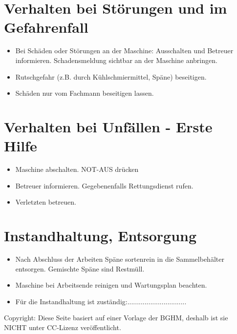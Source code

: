 \documentclass[fontsize=9pt]{scrartcl}
\newenvironment{smallitemize}{\begin{itemize}\itemsep -3pt}{\end{itemize}}
\begin{document}
\section{Verhalten bei Störungen und im Gefahrenfall}
\begin{smallitemize}
	\item Bei Schäden oder Störungen an der Maschine: Ausschalten und Betreuer informieren. Schadensmeldung sichtbar an der Maschine anbringen.
	\item Rutschgefahr (z.B. durch Kühlschmiermittel, Späne) beseitigen.
	\item Schäden nur vom Fachmann beseitigen lassen.
\end{smallitemize}

\section{Verhalten bei Unfällen - Erste Hilfe}
\begin{smallitemize}
	\item Maschine abschalten. NOT-AUS drücken
	\item Betreuer informieren. Gegebenenfalls Rettungsdienst rufen.
	\item Verletzten betreuen.
\end{smallitemize}

\section{Instandhaltung, Entsorgung}
\begin{smallitemize}
	\item Nach Abschluss der Arbeiten Späne sortenrein in die Sammelbehälter entsorgen. Gemischte Späne sind Restmüll.
	\item Maschine bei Arbeitsende reinigen und Wartungsplan beachten.
		\vspace{5mm}
	\item Für die Instandhaltung ist zuständig:...............................
\end{smallitemize}
\vfill
Copyright:  Diese Seite basiert auf einer Vorlage der BGHM, deshalb ist sie NICHT unter CC-Lizenz veröffentlicht.
\end{document}
